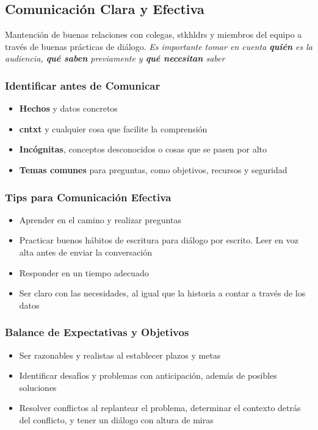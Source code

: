 \subsection{Comunicación Clara y Efectiva}
Mantención de buenas relaciones con colegas, \gls{stkhldrs} y miembros del equipo a través de buenas prácticas de diálogo. \textit{Es importante tomar en cuenta \textbf{quién} es la audiencia, \textbf{qué saben} previamente y \textbf{qué necesitan} saber}

\subsubsection{Identificar antes de Comunicar}
\begin{itemize}
    \item {\textbf{Hechos} y datos concretos}
    \item {\textbf{\gls{cntxt}} y cualquier cosa que facilite la comprensión}
    \item {\textbf{Incógnitas}, conceptos desconocidos o cosas que se pasen por alto}
    \item {\textbf{Temas comunes} para preguntas, como objetivos, recursos y seguridad}
\end{itemize}

\subsubsection{Tips para Comunicación Efectiva}
\begin{itemize}
    \item {Aprender en el camino y realizar preguntas}
    \item {Practicar buenos hábitos de escritura para diálogo por escrito. Leer en voz alta antes de enviar la conversación}
    \item {Responder en un tiempo adecuado}
    \item {Ser claro con las necesidades, al igual que la historia a contar a través de los datos}
\end{itemize}

\subsubsection{Balance de Expectativas y Objetivos}
\begin{itemize}
    \item {Ser razonables y realistas al establecer plazos y metas}
    \item {Identificar desafíos y problemas con anticipación, además de posibles soluciones}
    \item {Resolver conflictos al replantear el problema, determinar el contexto detrás del conflicto, y tener un diálogo con altura de miras}
\end{itemize}

